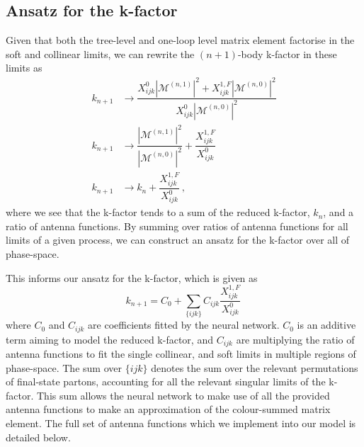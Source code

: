 \documentclass[main.tex]{subfiles}
\begin{document}
\subsection{Ansatz for the k-factor}\label{sec:1L_ansatz}
Given that both the tree-level and one-loop level matrix
element factorise in the soft and collinear limits,
we can rewrite the $(n+1)$-body k-factor in these limits as
\begin{align}
    k_{n+1} &\longrightarrow \dfrac{X_{ijk}^{0} |\mathcal{M}^{(n, 1)}|^{2} + X_{ijk}^{1,F} |\mathcal{M}^{(n, 0)}|^{2}}{X_{ijk}^{0} |\mathcal{M}^{(n, 0)}|^{2}} \nonumber \\
    k_{n+1} &\longrightarrow \dfrac{|\mathcal{M}^{(n, 1)}|^{2}}{|\mathcal{M}^{(n, 0)}|^{2}} + \dfrac{X_{ijk}^{1,F}}{X_{ijk}^{0}} \\
    k_{n+1} &\longrightarrow k_{n} + \dfrac{X_{ijk}^{1,F}}{X_{ijk}^{0}} \nonumber \, ,
    \label{eq:k_factorisation}
\end{align}
where we see that the k-factor tends to a sum
of the reduced k-factor, $k_{n}$, and a ratio
of antenna functions. By summing over ratios of
antenna functions for all limits of a
given process, we can construct an ansatz for the
k-factor over all of phase-space.

This informs our ansatz for the k-factor, which is given as
\begin{equation}
    k_{n+1} = C_{0} + \sum_{\{ijk\}} C_{ijk}\dfrac{X_{ijk}^{1,F}}{X_{ijk}^{0}} \,
    \label{eq:1L_ansatz}
\end{equation}
where $C_{0}$ and $C_{ijk}$ are coefficients fitted by the neural network.
$C_{0}$ is an additive term aiming to model the reduced
k-factor, and $C_{ijk}$ are multiplying the ratio of
antenna functions to fit the single collinear, and
soft limits in multiple regions of phase-space.
The sum over $\{ijk\}$ denotes the sum over
the relevant permutations of final-state partons, accounting
for all the relevant singular limits of the k-factor.
This sum allows the neural network to make use of all
the provided antenna functions to make an approximation
of the colour-summed matrix element.
The full set of antenna functions which we implement into our
model is detailed below.
\end{document}
